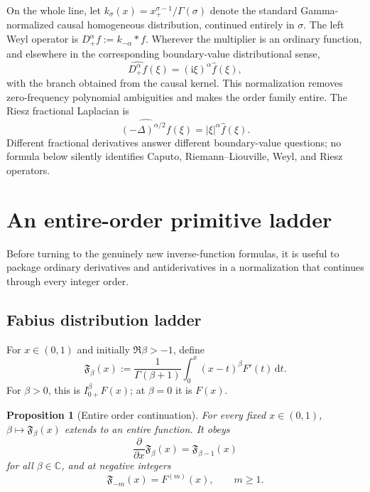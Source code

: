 \documentclass[11pt,oneside]{article}
\newtheorem{proposition}[theorem]{Proposition}
\theoremstyle{definition}
\theoremstyle{remark}
\newcommand{\C}{\mathbb C}
\newcommand{\dd}{\,\mathrm d}
\newcommand{\ii}{\mathrm i}
\begin{document}
On the whole line, let
$k_\sigma(x)=x_+^{\sigma-1}/\Gamma(\sigma)$ denote the standard
Gamma-normalized causal homogeneous distribution, continued entirely in
$\sigma$.  The left Weyl operator is
$D_+^\alpha f:=k_{-\alpha}*f$.  Wherever the multiplier is an ordinary
function, and elsewhere in the corresponding boundary-value distributional
sense,
\begin{equation}
 \widehat{D_+^\alpha f}(\xi)=(\ii\xi)^\alpha\widehat f(\xi),
 \label{eq:Weyl-def}
\end{equation}
with the branch obtained from the causal kernel.  This normalization removes
zero-frequency polynomial ambiguities and makes the order family entire.  The
Riesz fractional Laplacian is
\begin{equation}
 \widehat{(-\Delta)^{\alpha/2}f}(\xi)=|\xi|^\alpha\widehat f(\xi).
 \label{eq:Riesz-def}
\end{equation}
Different fractional derivatives answer different boundary-value questions;
no formula below silently identifies Caputo, Riemann--Liouville, Weyl, and
Riesz operators.

\section{An entire-order primitive ladder}
\label{sec:entire-ladder}

Before turning to the genuinely new inverse-function formulas, it is useful
to package ordinary derivatives and antiderivatives in a normalization that
continues through every integer order.

\subsection{Fabius distribution ladder}

For $x\in(0,1)$ and initially $\Re\beta>-1$, define
\begin{equation}
 \mathfrak F_\beta(x)
 :=\frac1{\Gamma(\beta+1)}
   \int_0^x(x-t)^\beta F'(t)\dd t.
 \label{eq:F-entire-ladder}
\end{equation}
For $\beta>0$, this is $I_{0+}^{\beta}F(x)$; at $\beta=0$ it is $F(x)$.

\begin{proposition}[Entire order continuation]
For every fixed $x\in(0,1)$, $\beta\mapsto\mathfrak F_\beta(x)$ extends to an
entire function.  It obeys
\begin{equation}
 \frac{\partial}{\partial x}\mathfrak F_\beta(x)
 =\mathfrak F_{\beta-1}(x)
 \label{eq:F-order-ladder}
\end{equation}
for all $\beta\in\C$, and at negative integers
\begin{equation}
 \mathfrak F_{-m}(x)=F^{(m)}(x),\qquad m\ge1.
 \label{eq:F-negative-orders}
\end{equation}
\end{proposition}
\end{document}
